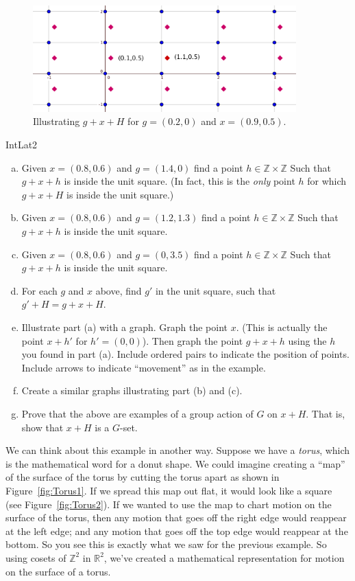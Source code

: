 \begin{figure}[ht]
\begin{center}
\includegraphics[width=4.0in]{images/IntLat3.png}
\caption{Illustrating $g+x+H$ for $g=(0.2,0)$ and $x=(0.9,0.5)$.}
\label{fig:IntegerLattice3}
\end{center}
\end{figure}


\begin {exercise}{IntLat2}
\begin {enumerate}[(a)]
\item Given $x=(0.8,0.6)$ and $g=(1.4,0)$ find a point  $h\in \mathbb{Z}\times \mathbb{Z}$ Such that $g+x+h$ is inside the unit square.  (In fact, this is the \emph{only} point $h$ for which $g+x+H$ is inside the unit square.)
\item Given $x=(0.8,0.6)$ and $g=(1.2,1.3)$ find a point  $h\in \mathbb{Z}\times \mathbb{Z}$ Such that $g+x+h$ is inside the unit square.
\item Given $x=(0.8,0.6)$ and $g=(0,3.5)$ find a point  $h\in \mathbb{Z}\times \mathbb{Z}$ Such that $g+x+h$ is inside the unit square.
\item For each $g$ and $x$ above, find $g'$ in the unit square, such that $g'+H=g+x+H$.
\item Illustrate part (a) with a graph.  Graph the point $x$.  (This is actually the point $x+h'$ for $h'=(0,0)$).  Then graph the point $g+x+h$ using the $h$ you found in part (a).   Include ordered pairs to indicate the position of points.  Include arrows to indicate ``movement'' as in the example.
\item Create a similar graphs illustrating part (b) and (c).
\item Prove that the above are examples of a group action of $G$ on $x+H$.  That is, show that $x+H$ is a $G$-set. 
\end{enumerate}
\end {exercise}
We can think about this example in another way.  Suppose we have a \emph{torus}, which is the mathematical word for a donut shape. We could imagine creating a ``map'' of the surface of the torus by cutting the torus apart as shown in Figure~\ref{fig:Torus1}. If we spread this map out flat, it would look like a square (see Figure~\ref{fig:Torus2}). If we wanted to use the map to chart motion on the surface of the torus, then any motion that goes off the right edge would reappear at the left edge; and any motion that goes off the top edge would reappear at the bottom.  So you see this is exactly what we saw for the previous example. So using cosets of $\mathbb{Z}^2$ in $\mathbb{R}^2$, we've created a mathematical representation for motion on the surface of a torus.

